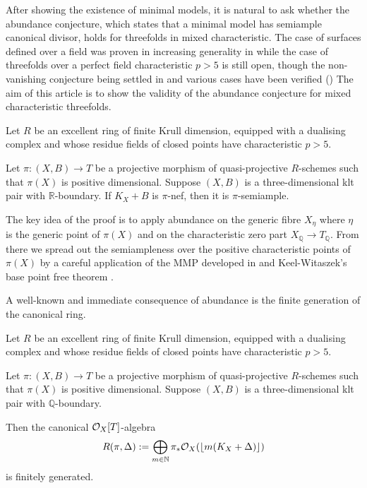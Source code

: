 	After showing the existence of minimal models, it is natural to ask whether the abundance conjecture, which states that a minimal model has semiample canonical divisor, holds for threefolds in mixed characteristic. 
	The case of surfaces defined over a field was proven in increasing generality in \cite{fujino2012log, Tan14, tanaka2020abundance} while the case of threefolds over a perfect field characteristic $p>5$ is still open, though the non-vanishing conjecture being settled in \cite{XZ19, Wit} and various cases have been verified (\cite{DW19, Zha20})
	The aim of this article is to show the validity of the abundance conjecture for mixed characteristic threefolds.
	
	\begin{theorem}\label{main-thm}
		Let $R$ be an excellent ring of finite Krull dimension, equipped with a dualising complex and whose residue fields of closed points have characteristic $p>5$.
		
		Let $\pi \colon (X,B) \to T$ be a projective morphism of quasi-projective $R$-schemes such that $\pi(X)$ is positive dimensional.
		Suppose $(X,B)$ is a three-dimensional klt pair with $\mathbb{R}$-boundary. If $K_X+B$ is $\pi$-nef, then it is $\pi$-semiample.
	\end{theorem}
	
	The key idea of the proof is to apply abundance on the generic fibre $X_\eta$ where $\eta$ is the generic point of $\pi(X)$ and on the characteristic zero part $X_{\mathbb{Q}} \to T_{\mathbb{Q}}$. From there we spread out the semiampleness over the positive characteristic points of $\pi(X)$ by a careful application of the MMP developed in \cite{bhatt2020} and Keel-Witaszek's base point free theorem \cite{witaszek2020keels}. 
	
	A well-known and immediate consequence of abundance is the finite generation of the canonical ring.
	
	\begin{theorem}
		Let $R$ be an excellent ring of finite Krull dimension, equipped with a dualising complex and whose residue fields of closed points have characteristic $p>5$.
		
		Let $\pi \colon (X,B) \to T$ be a projective morphism of quasi-projective $R$-schemes such that $\pi(X)$ is positive dimensional.
		Suppose $(X,B)$ is a three-dimensional klt pair with $\mathbb{Q}$-boundary. 
		
		Then the canonical $\mathcal{O}_{X}[T]$-algebra
		\[R(\pi,\Delta):=\bigoplus_{m \in \mathbb{N}} \pi_{*}\mathcal{O}_{X}(\lfloor m(K_{X}+\Delta)\rfloor)\]
		is finitely generated.
	\end{theorem}

